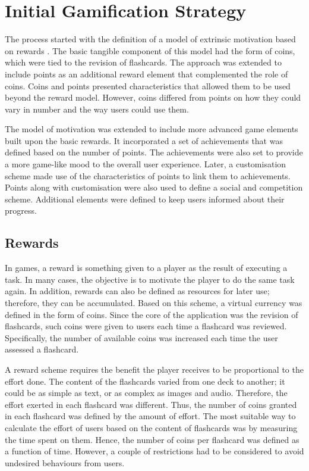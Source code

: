 \section{Initial Gamification Strategy}
\label{desi-gamification-strategy}
The process started with the definition of a model of extrinsic motivation based on rewards \citep{richter2015studying}. The basic tangible component of this model had the form of coins, which were tied to the revision of flashcards. The approach was extended to include points as an additional reward element that complemented the role of coins. Coins and points presented characteristics that allowed them to be used beyond the reward model. However, coins differed from points on how they could vary in number and the way users could use them.

The model of motivation was extended to include more advanced game elements built upon the basic rewards. It incorporated a set of achievements that was defined based on the number of points. The achievements were also set to provide a more game-like mood to the overall user experience. Later, a customisation scheme made use of the characteristics of points to link them to achievements. Points along with customisation were also used to define a social and competition scheme. Additional elements were defined to keep users informed about their progress.

\subsection{Rewards}
In games, a reward is something given to a player as the result of executing a task. In many cases, the objective is to motivate the player to do the same task again. In addition, rewards can also be defined as resources for later use; therefore, they can be accumulated. Based on this scheme, a virtual currency was defined in the form of coins. Since the core of the application was the revision of flashcards, such coins were given to users each time a flashcard was reviewed. Specifically, the number of available coins was increased each time the user assessed a flashcard.

A reward scheme requires the benefit the player receives to be proportional to the effort done. The content of the flashcards varied from one deck to another; it could be as simple as text, or as complex as images and audio. Therefore, the effort exerted in each flashcard was different. Thus, the number of coins granted in each flashcard was defined by the amount of effort. The most suitable way to calculate the effort of users based on the content of flashcards was by measuring the time spent on them. Hence, the number of coins per flashcard was defined as a function of time. However, a couple of restrictions had to be considered to avoid undesired behaviours from users.

